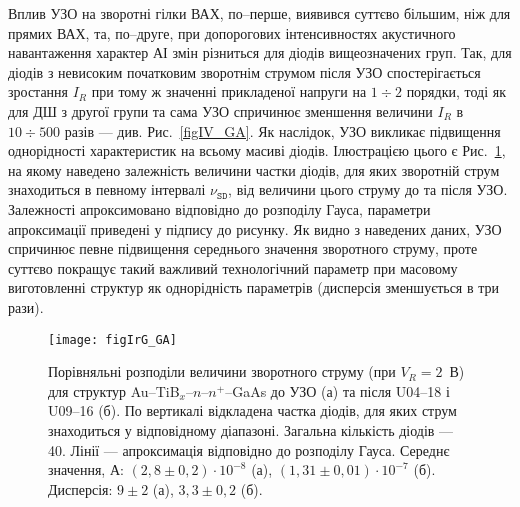 \documentclass[a4paper,14pt,oneside,openany]{memoir}
\begin{document}
Вплив УЗО на зворотні гілки ВАХ, по--перше, виявився суттєво більшим, ніж для прямих ВАХ, та, по--друге,
при допорогових інтенсивностях акустичного навантаження характер АІ змін різниться для діодів вищеозначених груп.
Так, для діодів з невисоким початковим зворотнім струмом після УЗО спостерігається зростання $I_R$ при тому ж значенні прикладеної напруги на $1\div2$ порядки,
тоді як для ДШ з другої групи та сама УЗО спричинює зменшення величини $I_R$ в $10\div500$ разів --- див. Рис.~\ref{figIV_GA}.
Як наслідок, УЗО викликає підвищення однорідності характеристик на всьому масиві діодів.
Ілюстрацією цього є Рис.~\ref{figIrG_GA}, на якому наведено залежність величини частки діодів, для яких зворотній струм знаходиться в певному інтервалі $\nu_\mathtt{SD}$,
від величини цього струму до та після УЗО.
Залежності апроксимовано відповідно до розподілу Гауса, параметри апроксимації приведені у підпису до рисунку.
Як видно з наведених даних, УЗО спричинює певне підвищення середнього значення зворотного струму, проте суттєво
покращує такий важливий технологічний параметр при масовому виготовленні структур як однорідність параметрів (дисперсія зменшується в три рази).

\begin{figure}
\center
\texttt{[image: figIrG\_GA]}%
\caption{\label{figIrG_GA}
Порівняльні розподіли величини зворотного струму (при $V_R=2$~В)
для структур Au--TiB$_x$--$n$--$n^+$--GaAs до УЗО (а) та після U04--18 і U09--16 (б).
По вертикалі відкладена частка діодів, для яких струм знаходиться у відповідному діапазоні.
Загальна кількість діодів --- 40.
Лінії --- апроксимація відповідно до розподілу Гауса.
Середнє значення, А:
$(2,8\pm0,2)\cdot10^{-8}$ (а),
$(1,31\pm0,01)\cdot10^{-7}$ (б).
Дисперсія:
$9\pm2$ (а),
$3,3\pm0,2$ (б).
}
\end{figure}
\end{document}
